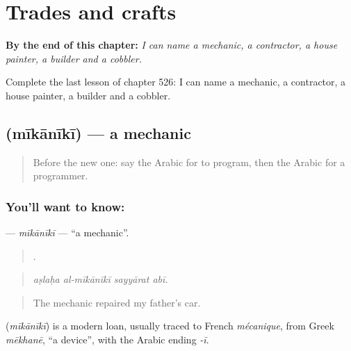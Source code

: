 
\chapter{Trades and crafts}
\label{ch:ar-trades-and-crafts}

\begin{chapteropening}
\textbf{By the end of this chapter:} \emph{I can name a mechanic, a contractor, a house painter, a builder and a cobbler.}

Complete the last lesson of chapter 526: I can name a mechanic, a contractor, a house painter, a builder and a cobbler.
\end{chapteropening}

\section[\texorpdfstring{\ar{ميكانيكي} (mīkānīkī)}{ميكانيكي (mīkānīkī)}]{ (mīkānīkī) — a mechanic}

\label{lesson:AR-C526-mikaniki}



\begin{quote}
Before the new one: say the Arabic for to program, then the Arabic for a programmer.
\end{quote}

\subsection*{You'll want to know: }
\textbf{} — \emph{mīkānīkī} — \textquotedblleft{}a mechanic\textquotedblright{}.

\begin{quote}
   .
\end{quote}

\begin{quote}
\emph{aṣlaḥa al-mīkānīkī sayyārat abī.}
\end{quote}

\begin{quote}
The mechanic repaired my father's car.
\end{quote}

\begin{cousinweb}
\textbf{} (\emph{mīkānīkī}) is a modern loan, usually traced to French \emph{mécanique}, from Greek \emph{mēkhanē}, \textquotedblleft{}a device\textquotedblright{}, with the Arabic ending \emph{-ī}.
\end{cousinweb}

